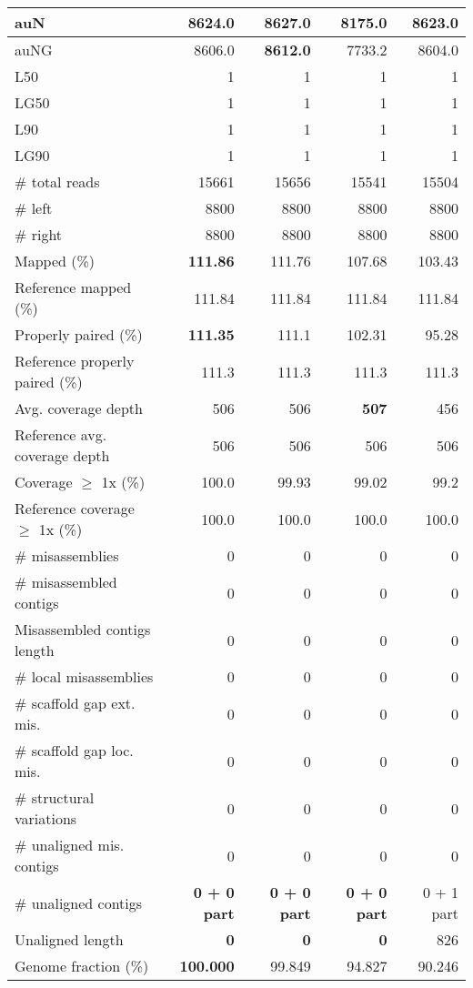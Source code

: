 \documentclass[12pt,a4paper]{article}
\begin{document}
\begin{table}[ht]
\begin{center}
\begin{tabular}{|l*{4}{|r}|}
auN & 8624.0 & {\bf 8627.0} & 8175.0 & 8623.0 \\ \hline
auNG & 8606.0 & {\bf 8612.0} & 7733.2 & 8604.0 \\ \hline
L50 & 1 & 1 & 1 & 1 \\ \hline
LG50 & 1 & 1 & 1 & 1 \\ \hline
L90 & 1 & 1 & 1 & 1 \\ \hline
LG90 & 1 & 1 & 1 & 1 \\ \hline
\# total reads & 15661 & 15656 & 15541 & 15504 \\ \hline
\# left & 8800 & 8800 & 8800 & 8800 \\ \hline
\# right & 8800 & 8800 & 8800 & 8800 \\ \hline
Mapped (\%) & {\bf 111.86} & 111.76 & 107.68 & 103.43 \\ \hline
Reference mapped (\%) & 111.84 & 111.84 & 111.84 & 111.84 \\ \hline
Properly paired (\%) & {\bf 111.35} & 111.1 & 102.31 & 95.28 \\ \hline
Reference properly paired (\%) & 111.3 & 111.3 & 111.3 & 111.3 \\ \hline
Avg. coverage depth & 506 & 506 & {\bf 507} & 456 \\ \hline
Reference avg. coverage depth & 506 & 506 & 506 & 506 \\ \hline
Coverage $\geq$ 1x (\%) & 100.0 & 99.93 & 99.02 & 99.2 \\ \hline
Reference coverage $\geq$ 1x (\%) & 100.0 & 100.0 & 100.0 & 100.0 \\ \hline
\# misassemblies & 0 & 0 & 0 & 0 \\ \hline
\# misassembled contigs & 0 & 0 & 0 & 0 \\ \hline
Misassembled contigs length & 0 & 0 & 0 & 0 \\ \hline
\# local misassemblies & 0 & 0 & 0 & 0 \\ \hline
\# scaffold gap ext. mis. & 0 & 0 & 0 & 0 \\ \hline
\# scaffold gap loc. mis. & 0 & 0 & 0 & 0 \\ \hline
\# structural variations & 0 & 0 & 0 & 0 \\ \hline
\# unaligned mis. contigs & 0 & 0 & 0 & 0 \\ \hline
\# unaligned contigs & {\bf 0 + 0 part} & {\bf 0 + 0 part} & {\bf 0 + 0 part} & 0 + 1 part \\ \hline
Unaligned length & {\bf 0} & {\bf 0} & {\bf 0} & 826 \\ \hline
Genome fraction (\%) & {\bf 100.000} & 99.849 & 94.827 & 90.246 \\ \hline

\end{tabular}
\end{center}
\end{table}
\end{document}
